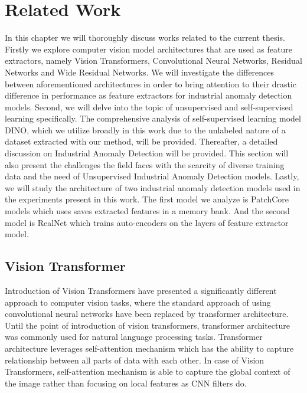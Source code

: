 \chapter{Related Work}
\label{chapter:ch2}

In this chapter we will thoroughly discuss works related to the current thesis. Firstly we explore computer vision model architectures that are used as feature extractors, namely Vision Transformers, Convolutional Neural Networks, Residual Networks and Wide Residual Networks. We will investigate the differences between aforementioned architectures in order to bring attention to their drastic difference in performance as feature extractors for industrial anomaly detection models. Second, we will delve into the topic of unsupervised and self-supervised learning specifically. The comprehensive analysis of self-supervised learning model DINO, which we utilize broadly in this work due to the unlabeled nature of a dataset extracted with our method, will be provided. Thereafter, a detailed discussion on Industrial Anomaly Detection will be provided. This section will also present the challenges the field faces with the scarcity of diverse training data and the need of Unsupervised Industrial Anomaly Detection models. Lastly, we will study the architecture of two industrial anomaly detection models used in the experiments present in this work. The first model we analyze is PatchCore models which uses saves extracted features in a memory bank. And the second model is RealNet which trains auto-encoders on the layers of feature extractor model.

\section{Vision Transformer}
\label{vit}

Introduction of Vision Transformers have presented a significantly different approach to computer vision tasks, where the standard approach of using convolutional neural networks have been replaced by transformer architecture. Until the point of introduction of vision transformers, transformer architecture was commonly used for natural language processing tasks. Transformer architecture leverages self-attention mechanism which has the ability to capture relationship between all parts of data with each other. In case of Vision Transformers, self-attention mechanism is able to capture the global context of the image rather than focusing on local features as CNN filters do.

